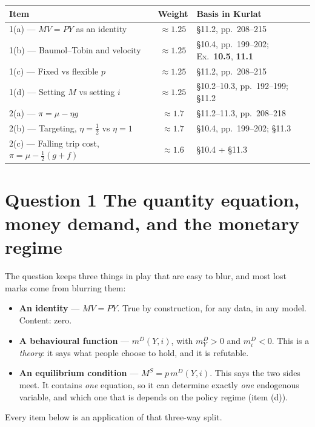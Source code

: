 \documentclass[11pt, a4paper]{article}
\newcommand{\Ms}{M^{S}}
\newcommand{\md}{m^{D}}
\begin{document}
\begin{center}
\small
\begin{tabular}{@{}lcl@{}}
\toprule
\textbf{Item} & \textbf{Weight} & \textbf{Basis in Kurlat} \\
\midrule
1(a) --- $MV=PY$ as an identity & $\approx1.25$ & \S11.2, pp.\ 208--215 \\
1(b) --- Baumol--Tobin and velocity & $\approx1.25$ & \S10.4, pp.\ 199--202; Ex.\ \textbf{10.5}, \textbf{11.1} \\
1(c) --- Fixed vs flexible $p$ & $\approx1.25$ & \S11.2, pp.\ 208--215 \\
1(d) --- Setting $M$ vs setting $i$ & $\approx1.25$ & \S10.2--10.3, pp.\ 192--199; \S11.2 \\
\midrule
2(a) --- $\pi=\mu-\eta g$ & $\approx1.7$ & \S11.2--11.3, pp.\ 208--218 \\
2(b) --- Targeting, $\eta=\tfrac12$ vs $\eta=1$ & $\approx1.7$ & \S10.4, pp.\ 199--202; \S11.3 \\
2(c) --- Falling trip cost, $\pi=\mu-\tfrac12(g+f)$ & $\approx1.6$ & \S10.4 + \S11.3 \\
\bottomrule
\end{tabular}
\end{center}

\section{Question 1 \quad The quantity equation, money demand, and the monetary regime}

\begin{tcolorbox}[planbox, title={Before writing anything: separate the three objects}]
\small
The question keeps three things in play that are easy to blur, and most lost marks come from
blurring them:
\begin{itemize}
\item \textbf{An identity} --- $MV=PY$. True by construction, for any data, in any model.
      Content: zero.
\item \textbf{A behavioural function} --- $\md(Y,i)$, with $\md_Y>0$ and $\md_i<0$. This is a
      \emph{theory}: it says what people choose to hold, and it is refutable.
\item \textbf{An equilibrium condition} --- $\Ms=p\,\md(Y,i)$. This says the two sides meet.
      It contains \emph{one} equation, so it can determine exactly \emph{one} endogenous
      variable, and which one that is depends on the policy regime (item (d)).
\end{itemize}
Every item below is an application of that three-way split.
\end{tcolorbox}
\end{document}
